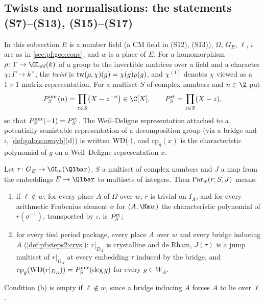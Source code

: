 \subsection{Twists and normalisations: the statements (S7)--(S13), (S15)--(S17)}\label{sec:pf:geo:twist}

In this subsection $E$ is a number field (a CM field in (S12), (S13)), $\Omega$, $G_E$, $\ell$, $\iota$ are as in
\cref{sec:pf:geo:conv}, and $w$ is a place of $E$. For a homomorphism $\rho\colon\Gamma\to\GL_{dd}(k)$ of a
group to the invertible matrices over a field and a character $\chi\colon\Gamma\to k^\times$, the
\emph{twist} is $\mathrm{tw}(\rho,\chi)(g)=\chi(g)\rho(g)$, and $\chi^{(1)}$ denotes $\chi$ viewed as a
$1\times1$ matrix representation. For a multiset $S$ of complex numbers and $n\in\Z$ put
\[
  \geounr_S(n)=\prod_{z\in S}\bigl(X-z^{-n}\bigr)\in\C[X],\qquad \geort_S=\prod_{z\in S}(X-z),
\]
so that $P^{\mathrm{unr}}_S(-1)=P^{\mathrm{rt}}_S$. The Weil--Deligne representation attached to a potentially
semistable representation of a decomposition group (via a bridge and $\iota$, \cref{def:galois:awayb}(d)) is
written $\mathrm{WD}(\cdot)$, and $\mathrm{cp}_g(x)$ is the characteristic polynomial of $g$ on a
Weil--Deligne representation $x$.

\begin{definition}\label{pf:geo:par}
Let $r\colon G_E\to\GL_n(\Qlbar)$, $S$ a multiset of complex numbers and $J$ a map from the embeddings
$E\to\Qlbar$ to multisets of integers. Then $\mathrm{Par}_w(r;S,J)$ means:
\begin{enumerate}[label=(\alph*),nosep]
\item if $\ell\notin w$: for every place $A$ of $\Omega$ over $w$, $r$ is trivial on $I_A$, and for every
  arithmetic Frobenius element $\sigma$ for $(A,\Nm w)$ the characteristic polynomial of $r(\sigma^{-1})$,
  transported by $\iota$, is $P^{\mathrm{rt}}_S$;
\item for every tied period package, every place $A$ over $w$ and every bridge inducing $A$
  (\cref{def:pf:steps2:crys}): $r|_{D_A}$ is crystalline and de Rham, $J(\tau)$ is a jump multiset of
  $r|_{D_A}$ at every embedding $\tau$ induced by the bridge, and
  $\mathrm{cp}_g(\mathrm{WD}(r|_{D_A}))=P^{\mathrm{unr}}_S(\deg g)$ for every $g\in W_A$.
\end{enumerate}
\end{definition}

Condition (b) is empty if $\ell\notin w$, since a bridge inducing $A$ forces $A$ to lie over $\ell$.

